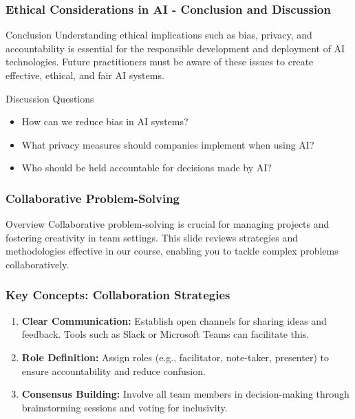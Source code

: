 \documentclass{beamer}
\begin{document}
\begin{frame}[fragile]
    \frametitle{Ethical Considerations in AI - Conclusion and Discussion}
    \begin{block}{Conclusion}
        Understanding ethical implications such as bias, privacy, and accountability is essential for the responsible development and deployment of AI technologies.
        Future practitioners must be aware of these issues to create effective, ethical, and fair AI systems.
    \end{block}
    
    \begin{block}{Discussion Questions}
        \begin{itemize}
            \item How can we reduce bias in AI systems?
            \item What privacy measures should companies implement when using AI?
            \item Who should be held accountable for decisions made by AI?
        \end{itemize}
    \end{block}
\end{frame}

\begin{frame}[fragile]
    \frametitle{Collaborative Problem-Solving}
    \begin{block}{Overview}
        Collaborative problem-solving is crucial for managing projects and fostering creativity in team settings. This slide reviews strategies and methodologies effective in our course, enabling you to tackle complex problems collaboratively.
    \end{block}
\end{frame}

\begin{frame}[fragile]
    \frametitle{Key Concepts: Collaboration Strategies}
    \begin{enumerate}
        \item \textbf{Clear Communication:} Establish open channels for sharing ideas and feedback. Tools such as Slack or Microsoft Teams can facilitate this.
        \item \textbf{Role Definition:} Assign roles (e.g., facilitator, note-taker, presenter) to ensure accountability and reduce confusion.
        \item \textbf{Consensus Building:} Involve all team members in decision-making through brainstorming sessions and voting for inclusivity.
    \end{enumerate}
\end{frame}
\end{document}
